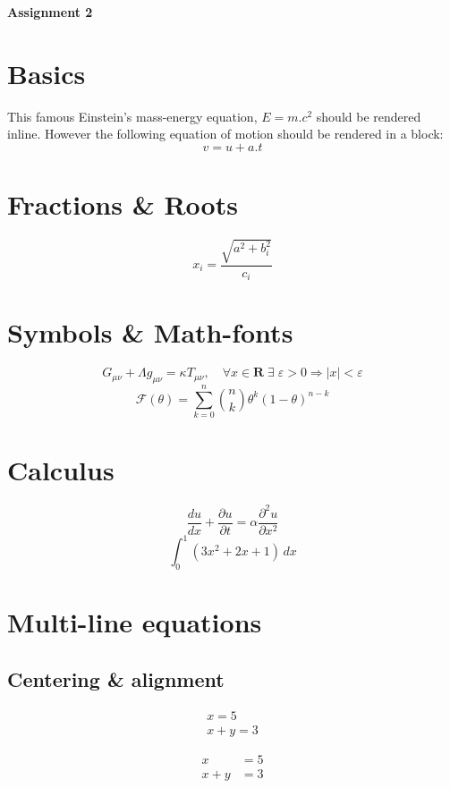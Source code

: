 \documentclass[12pt, a4paper]{article}
\begin{document}
\begin{center}
  {\LARGE \textbf{Assignment 2}}
\end{center}
\vspace{1em}

\section{Basics}

This famous Einstein's mass-energy equation, $E = m.c^{2}$ should be rendered inline.
However the following equation of motion should be rendered in a block:
\[ v = u + a.t \]

\section{Fractions \& Roots}

\[ x_{i} = \frac{\sqrt{a^{2} + b^{2}_{i}}}{c_{i}} \]

\section{Symbols \& Math-fonts}

\[ G_{\mu\nu} + \Lambda g_{\mu\nu} = \kappa T_{\mu\nu}, \quad \forall x \in \mathbf{R} \; \exists \; \varepsilon > 0 \Rightarrow |x| < \varepsilon \]
\[ \mathcal{F}(\theta) = \sum_{k=0}^{n} \binom{n}{k} \theta^{k} (1 - \theta)^{n-k} \]

\section{Calculus}

\[ \frac{du}{dx} + \frac{\partial u}{\partial t} = \alpha \frac{\partial^{2} u}{\partial x^{2}} \]
\[ \int_{0}^{1} (3x^{2} + 2x + 1) \, dx \]

\section{Multi-line equations}

\subsection{Centering \& alignment}

\begin{gather}
  x = 5 \\
  x + y = 3
\end{gather}

\begin{align}
  x &= 5 \\
  x + y &= 3
\end{align}
\end{document}
